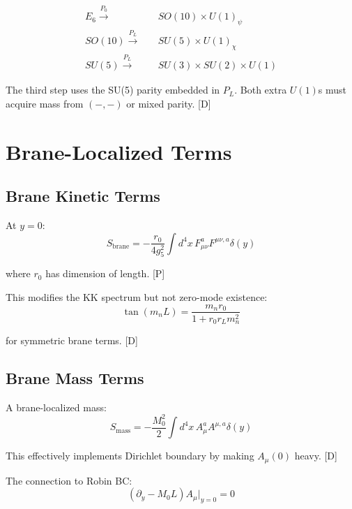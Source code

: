 \documentclass[11pt,a4paper]{article}
\newcommand{\tagD}{\textcolor{blue!70!black}{[D]}}
\newcommand{\tagP}{\textcolor{green!50!black}{[P]}}
\begin{document}
\begin{align}
\label{eq:e6-step1}
E_6 \xrightarrow{P_0} & \quad SO(10) \times U(1)_\psi \\
\label{eq:e6-step2}
SO(10) \xrightarrow{P_L} & \quad SU(5) \times U(1)_\chi \\
\label{eq:e6-step3}
SU(5) \xrightarrow{P_L} & \quad SU(3) \times SU(2) \times U(1)
\end{align}

The third step uses the SU(5) parity embedded in $P_L$. Both extra $U(1)$s
must acquire mass from $(-, -)$ or mixed parity. \tagD

\section{Brane-Localized Terms}
\label{app:brane}

\subsection{Brane Kinetic Terms}

At $y = 0$:
\begin{equation}
\label{eq:brane-kinetic}
S_{\text{brane}} = -\frac{r_0}{4g_5^2} \int d^4x \, F_{\mu\nu}^a F^{\mu\nu,a} \delta(y)
\end{equation}

where $r_0$ has dimension of length. \tagP

This modifies the KK spectrum but not zero-mode existence:
\begin{equation}
\label{eq:modified-spectrum}
\tan(m_n L) = \frac{m_n r_0}{1 + r_0 r_L m_n^2}
\end{equation}

for symmetric brane terms. \tagD

\subsection{Brane Mass Terms}

A brane-localized mass:
\begin{equation}
\label{eq:brane-mass}
S_{\text{mass}} = -\frac{M_0^2}{2} \int d^4x \, A_\mu^a A^{\mu,a} \delta(y)
\end{equation}

This effectively implements Dirichlet boundary by making $A_\mu(0)$ heavy. \tagD

The connection to Robin BC:
\begin{equation}
\label{eq:robin-from-mass}
(\partial_y - M_0 L) A_\mu \big|_{y=0} = 0
\end{equation}
\end{document}
